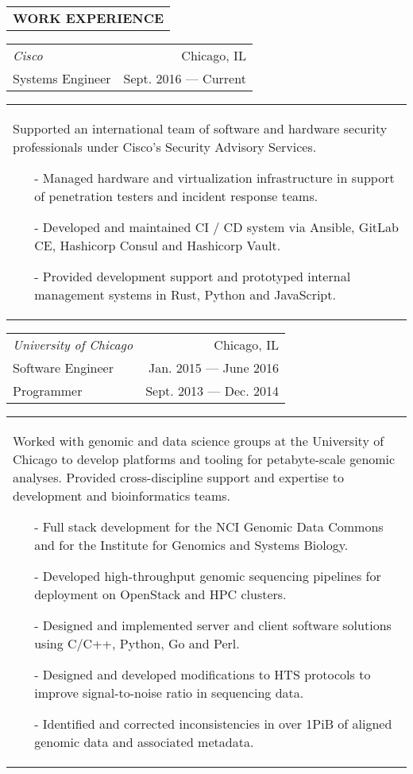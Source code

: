 \begin{tabularx}{\textwidth}{L}
    \textbf{WORK EXPERIENCE}
\end{tabularx}

\begin{tabularx}{\textwidth}{L R}
    \normalsize\textit{Cisco} & Chicago, IL \\
    Systems Engineer & Sept. 2016 --- Current \\
\end{tabularx}
\begin{tabularx}{\textwidth}{X}
    \vspace{1pt}
    Supported an international team of software and hardware security professionals under Cisco's Security Advisory Services.
    \begin{itemize}
        \itemsep{}
        \item[-] Managed hardware and virtualization infrastructure in support of penetration testers and incident response teams.
        \item[-] Developed and maintained CI / CD system via Ansible, GitLab CE, Hashicorp Consul and Hashicorp Vault.
        \item[-] Provided development support and prototyped internal management systems in Rust, Python and JavaScript.
    \end{itemize}
\end{tabularx}

\begin{tabularx}{\textwidth}{L R}
    \normalsize\textit{University of Chicago} & Chicago, IL \\
    Software Engineer & Jan. 2015 --- June 2016 \\
    Programmer & Sept. 2013 --- Dec. 2014 \\
\end{tabularx}
\begin{tabularx}{\textwidth}{X}
    \vspace{1pt}
    Worked with genomic and data science groups at the University of Chicago to develop platforms and tooling for petabyte-scale genomic analyses. Provided cross-discipline support and expertise to development and bioinformatics teams.
    \begin{itemize}
        \itemsep{}
        \item[-] Full stack development for the NCI Genomic Data Commons and for the Institute for Genomics and Systems Biology.
        \item[-] Developed high-throughput genomic sequencing pipelines for deployment on OpenStack and HPC clusters.
        \item[-] Designed and implemented server and client software solutions using C/C++, Python, Go and Perl.
        \item[-] Designed and developed modifications to HTS protocols to improve signal-to-noise ratio in sequencing data.
        \item[-] Identified and corrected inconsistencies in over 1PiB of aligned genomic data and associated metadata.
    \end{itemize}
\end{tabularx}

